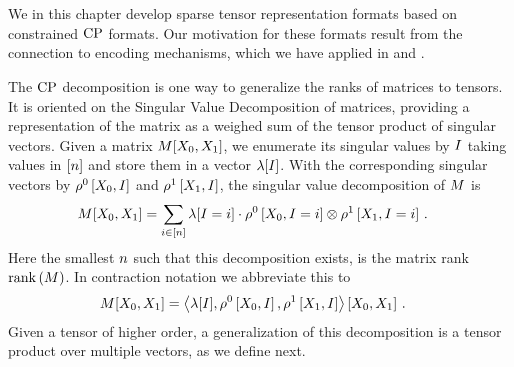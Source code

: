 \chapter{\chatextsparseCalculus}\label{cha:sparseRepresentation}

We in this chapter develop sparse tensor representation formats based on constrained $\mathrm{CP}$ formats.
Our motivation for these formats result from the connection to encoding mechanisms, which we have applied in  and .


The $\mathrm{CP}$ decomposition is one way to generalize the ranks of matrices to tensors.
It is oriented on the Singular Value Decomposition of matrices, providing a representation of the matrix as a weighed sum of the tensor product of singular vectors.
Given a matrix $M[X_{0},X_{1}]$, we enumerate its singular values by $I$ taking values in $[n]$ and store them in a vector $\lambda[I]$.
With the corresponding singular vectors by $\rho^{0}\left[X_{0},I\right]$ and $\rho^{1}\left[X_{1},I\right]$, the singular value decomposition of $M$ is
\begin{align*}
    M[X_{0},X_{1}]
    &= \sum_{i\in[n]} \lambda[I=i] \cdot \rho^{0}\left[X_{0},I=i\right] \otimes \rho^{1}\left[X_{1},I=i\right] \, .
\end{align*}
Here the smallest $n$ such that this decomposition exists, is the matrix rank $\mathrm{rank}\left(M\right)$.
In contraction notation we abbreviate this to
\begin{align*}
    M[X_{0},X_{1}]
    &= \left\langle \lambda[I],\rho^{0}\left[X_{0},I\right],\rho^{1}\left[X_{1},I\right]\right\rangle \left[ X_{0},X_{1} \right] \, .
\end{align*}
Given a tensor of higher order, a generalization of this decomposition is a tensor product over multiple vectors, as we define next.


